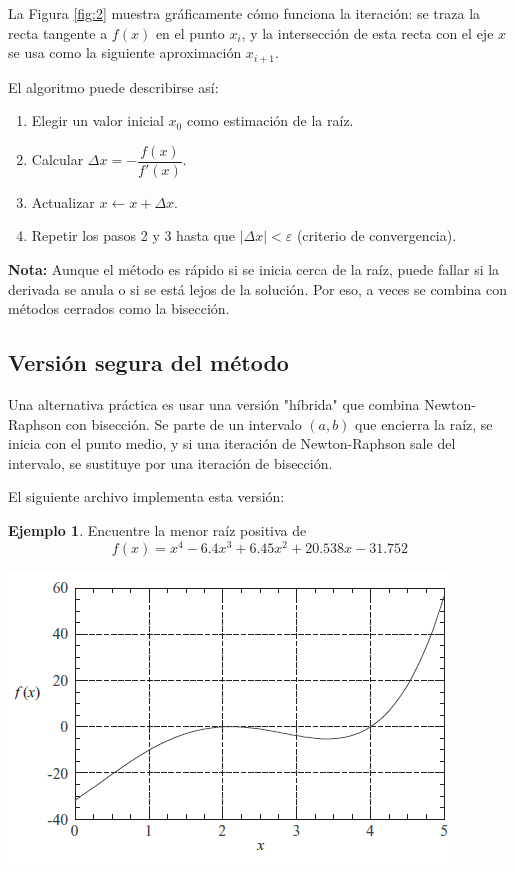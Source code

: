 \documentclass[12pt,letterpaper]{article}
\theoremstyle{definition}
\newtheorem{ejemplo}{Ejemplo}[section]
\theoremstyle{plain}
\theoremstyle{remark}
\begin{document}
La Figura \eqref{fig:2} muestra gráficamente cómo funciona la iteración: se traza la recta tangente a $f(x)$ en el punto $x_i$, y la intersección de esta recta con el eje $x$ se usa como la siguiente aproximación $x_{i+1}$.

El algoritmo puede describirse así:

\begin{enumerate}
    \item Elegir un valor inicial $x_0$ como estimación de la raíz.
    \item Calcular $\Delta x = -\dfrac{f(x)}{f'(x)}$.
    \item Actualizar $x \leftarrow x + \Delta x$.
    \item Repetir los pasos 2 y 3 hasta que $|\Delta x| < \varepsilon$ (criterio de convergencia).
\end{enumerate}

{\bf Nota:} Aunque el método es rápido si se inicia cerca de la raíz, puede fallar si la derivada se anula o si se está lejos de la solución. Por eso, a veces se combina con métodos cerrados como la bisección.

\subsection{Versión segura del método}

Una alternativa práctica es usar una versión "híbrida" que combina Newton-Raphson con bisección. Se parte de un intervalo $(a, b)$ que encierra la raíz, se inicia con el punto medio, y si una iteración de Newton-Raphson sale del intervalo, se sustituye por una iteración de bisección.

El siguiente archivo implementa esta versión:



\begin{ejemplo}
Encuentre la menor raíz positiva de
\[
f(x) = x^4 - 6.4x^3 + 6.45x^2 + 20.538x - 31.752
\]
\end{ejemplo}

\begin{center}
\includegraphics[scale=.5]{images/Clase3-f3.PNG}
\end{center}
\end{document}
